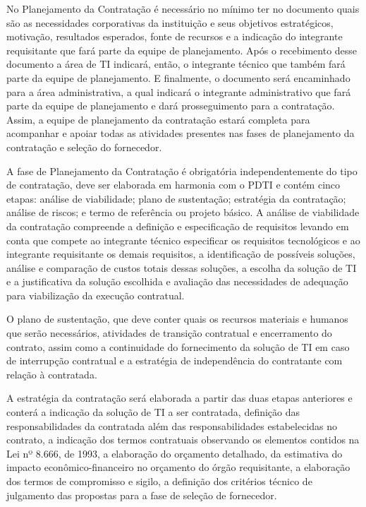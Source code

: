 No Planejamento da Contratação é necessário no mínimo ter no documento quais são as necessidades corporativas da instituição e seus objetivos estratégicos, motivação, resultados esperados, fonte de recursos e a indicação do integrante requisitante que fará parte da equipe de planejamento.  Após o recebimento desse documento a área de TI indicará, então, o integrante técnico que também fará parte da equipe de planejamento. E finalmente, o documento será encaminhado para a área administrativa, a qual indicará o integrante administrativo que fará parte da equipe de planejamento e dará prosseguimento para a contratação. Assim, a equipe de planejamento da contratação estará completa para acompanhar e apoiar todas as atividades presentes nas fases de planejamento da contratação e seleção do fornecedor.

A fase de Planejamento da Contratação é obrigatória independentemente do tipo de contratação, deve ser elaborada em harmonia com o PDTI e contém cinco etapas: análise de viabilidade; plano de sustentação; estratégia da contratação; análise de riscos; e termo de referência ou projeto básico. A análise de viabilidade da contratação compreende a definição e especificação de requisitos levando em conta que compete ao integrante técnico especificar os requisitos tecnológicos e ao integrante requisitante os demais requisitos, a identificação de possíveis soluções, análise e comparação de custos totais dessas soluções, a escolha da solução de TI e a justificativa da solução escolhida e avaliação das necessidades de adequação para viabilização da execução contratual. 

O plano de sustentação, que deve conter quais os recursos materiais e humanos que serão necessários, atividades de transição contratual e encerramento do contrato, assim como a continuidade do fornecimento da solução de TI em caso de interrupção contratual e a estratégia de independência do contratante com relação à contratada. 

A estratégia da contratação será elaborada a partir das duas etapas anteriores e conterá a indicação da solução de TI a ser contratada, definição das responsabilidades da contratada além das responsabilidades estabelecidas no contrato, a indicação dos termos contratuais observando os elementos contidos na Lei nº 8.666, de 1993, a elaboração do orçamento detalhado, da estimativa do impacto econômico-financeiro no orçamento do órgão requisitante, a elaboração dos termos de compromisso e sigilo, a definição dos critérios técnico de julgamento das propostas para a fase de seleção de fornecedor. 

